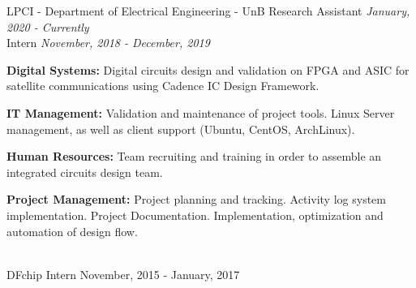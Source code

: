 \documentclass[a4paper]{twentysecondcv} %
\begin{document}
\begin{twenty} %
\twentyitem
    	{LPCI - Department of Electrical Engineering - UnB}
		{Research Assistant \hfill \textit{January, 2020 - Currently}\\}
        {Intern \hfill\textit{November, 2018 - December, 2019}}
        {
            \color{pblue}{\hspace{8pt}-\hspace{4pt}} \color{black}\textbf{Digital Systems: }Digital circuits design and validation on FPGA and ASIC for satellite communications using Cadence IC Design Framework.
            
            \color{pblue}{\hspace{8pt}-\hspace{4pt}} \color{black}\textbf{IT Management: }Validation and maintenance of project tools. Linux Server management, as well as client support (Ubuntu, CentOS, ArchLinux).
            
            \color{pblue}{\hspace{8pt}-\hspace{4pt}} \color{black}\textbf{Human Resources: }Team recruiting and training in order to assemble an integrated circuits design team.
            
            \color{pblue}{\hspace{8pt}-\hspace{4pt}} \color{black}\textbf{Project Management: }Project planning and tracking. Activity log system implementation. Project Documentation. Implementation, optimization and automation of design flow.
        }
        \\
	\twentyitem
    	{DFchip}
		{Intern}
        {November, 2015 - January, 2017}
        {
            \color{pblue}{\hspace{8pt}-\hspace{4pt}} 
            
            \color{pblue}{\hspace{8pt}-\hspace{4pt}} 
            
}
\end{twenty}
\end{document}
